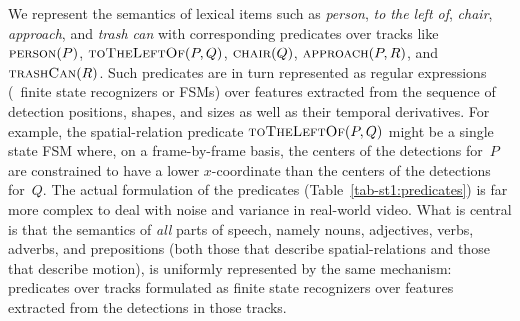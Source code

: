 We represent the semantics of lexical items such as \emph{person}, \emph{to the
  left of}, \emph{chair}, \emph{approach}, and \emph{trash can} with
corresponding predicates over tracks like $\textsc{person}(P)$,
$\textsc{toTheLeftOf}(P,Q)$, $\textsc{chair}(Q)$, $\textsc{approach}(P,R)$, and
$\textsc{trashCan}(R)$.
%
%
Such predicates are in turn represented as regular expressions (\ie\ finite
state recognizers or FSMs) over features extracted from the sequence of
detection positions, shapes, and sizes as well as their temporal derivatives.
%
For example, the spatial-relation predicate $\textsc{toTheLeftOf}(P,Q)$ might
be a single state FSM where, on a frame-by-frame basis, the centers of the
detections for~$P$ are constrained to have a lower $x$-coordinate than the
centers of the detections for~$Q$.
%
The actual formulation of the predicates (Table~\ref{tab-st1:predicates}) is far
more complex to deal with noise and variance in real-world video.
%
What is central is that the semantics of \emph{all} parts of speech, namely
nouns, adjectives, verbs, adverbs, and prepositions (both those that describe
spatial-relations and those that describe motion), is uniformly represented by
the same mechanism: predicates over tracks formulated as finite state
recognizers over features extracted from the detections in those tracks.

